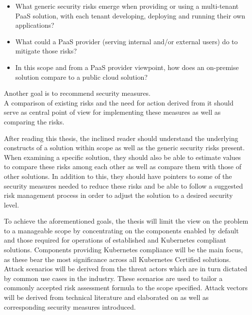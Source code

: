 \begin{itemize}

\item What generic security risks emerge when providing or using a multi-tenant PaaS solution,
with each tenant developing, deploying and running their own applications? 

\item What could a PaaS provider (serving internal and/or external users) do to mitigate those risks? 

\item  In this scope and from a PaaS provider viewpoint, how does an on-premise solution compare
to a public cloud solution? 

\end{itemize}

Another goal is to recommend security measures. \\
A comparison of existing risks and the need for action derived from it should serve as central point of view for implementing these measures as well as comparing the risks. 


After reading this thesis, the inclined reader should understand the underlying constructs of a solution within scope as well as the generic security risks present. When examining a specific solution, they should also be able to estimate values to compare these risks among each other as well as compare them with those of other solutions. In addition to this, they should have pointers to some of the security measures needed to reduce these risks and be able to follow a suggested risk management process in order to adjust the solution to a desired security level.


To achieve the aforementioned goals, the thesis will limit the view on the problem to a manageable scope by
concentrating on the components enabled by default and those required for operations of established and Kubernetes compliant solutions.
Components providing Kubernetes compliance will be the main focus, as these bear the most significance across all Kubernetes Certified solutions. 
Attack scenarios will be derived from the threat actors which are in turn dictated by common use cases in the industry.
These scenarios are used to tailor a commonly accepted risk assessment formula to the scope specified.
Attack vectors will be derived from technical literature and elaborated on as well as corresponding security measures introduced.


